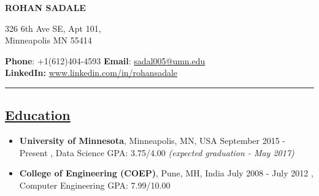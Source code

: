 \documentclass[10pt]{article}
\begin{document}

 

\hspace{1.9in} {{\bfseries {\huge {\selectfont ROHAN SADALE}}}}
\vspace{14pt}

\noindent \begin{minipage}[b]{0.3\hsize}
\normalsize 326 6th Ave SE, Apt 101,  \\
\normalsize Minneapolis MN 55414
\end{minipage}
\hfill
\begin{minipage}[b]{0.50 \hsize}
{\bfseries {\normalsize Phone}}: {\normalsize {+1(612)404-4593}} \hspace{0.15in} {\bfseries {\normalsize Email}}: {\normalsize \url{sadal005@umn.edu}} \\
{\bfseries {\normalsize LinkedIn:}} \normalsize \url{www.linkedin.com/in/rohansadale}
\end{minipage}

\vspace{4pt}

\hrule
\vspace{-0.2cm}
\subsection*{\underline{Education}}
\vspace{-0.1cm}
\begin{itemize}[leftmargin=*]
\item[] {\bfseries University of Minnesota}, Minneapolis, MN, USA \hfill September 2015 - Present
, Data Science \hspace{0.2in} GPA: 3.75/4.00  \hfill {\sl (expected graduation - May 2017)}
\vspace{-0.1cm}
\item[] {\bfseries College of Engineering (COEP)}, Pune, MH, India \hfill July 2008 - July 2012  
, Computer Engineering	 \hspace{0.2in} GPA: 7.99/10.00
\end{itemize}
\end{document}
